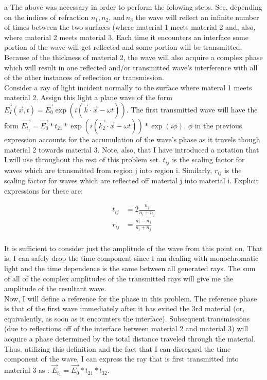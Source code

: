 \begin{homeworkProblem}
\begin{homeworkSection}{a}
The above was necessary in order to perform the folowing steps. See, depending on the indices 
of refraction $n_1, n_2, \,\text{and}\, n_3$ the wave will reflect an infinite number of times 
between the two surfaces (where material 1 meets material 2 and, also, where material 2 
meets material 3. Each time it encounters an interface some portion of the wave will get 
reflected and some portion will be transmitted. Because of the thickness of material 2, the 
wave will also acquire a complex phase which will result in one reflected and/or transmitted 
wave's interference with all of the other instances of reflection or transmission.
\\

Consider a ray of light incident normally to the surface where materal 1 meets material 2. Assign this light a plane wave of the form $\vec{E_I}(\vec{x},t) = \vec{E_0}\exp(i(\vec{k}\cdot\vec{x}-\omega t))$. The first transmitted wave will have the form $\vec{E_{t_1}} = \vec{E_0}*t_{21}*\exp(i(\vec{k_2}\cdot\vec{x}-\omega t))*\exp(i\phi)$. $\phi$ in the previous expression accounts for the accumulation of the wave's phase as it travels though material 2 towards material 3. Note, also, that I have introduced a notation that I will use throughout the rest of this problem set. $t_{ij}$ is the scaling factor for waves which are transmitted from region j into region i. Similarly, $r_{ij}$ is the scaling factor for waves which are reflected off material j into material i. Explicit expressions for these are:

\begin{align*}
  t_{ij} &= 2\frac{n_j}{n_i+n_j} \\ 
  r_{ij} &= \frac{n_i-n_j}{n_i+n_j}
\end{align*}
\\

It is sufficient to consider just the amplitude of the wave from this point on. That is, I can safely drop the time component since I am dealing with monochromatic light and the time dependence is the same between all generated rays. The sum of all of the complex amplitudes of the transmitted rays will give me the amplitude of the resultant wave.
\\

Now, I will define a reference for the phase in this problem. The reference phase is that of the first wave immediately after it has exited the 3rd material (or, equivalently, as soon as it encounters the interface). Subsequent transmissions (due to reflections off of the interface between material 2 and material 3) will acquire a phase determined by the total distance traveled through the material. Thus, utilizing this definition and the fact that I can disregard the time component of the wave, I can express the ray that is first transmitted into material 3 as : $\vec{E}_{t_1} = \vec{E_0}*t_{21}*t_{32}$.
\\


\end{homeworkSection}
\end{homeworkProblem}
